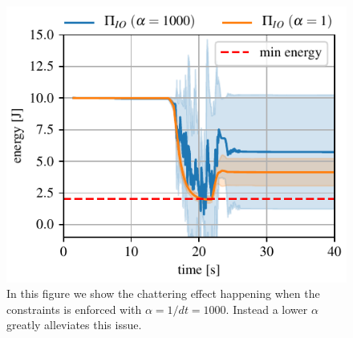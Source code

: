 \begin{figure}[t]
\centering
\includegraphics[width=0.8\columnwidth]{figures/fix_experiment/passivity_coefficient_comparison.pdf}
\caption{In this figure we show the chattering effect happening when the constraints is enforced with $\alpha = 1/dt = 1000$. Instead a lower $\alpha$ greatly alleviates this issue.}\label{fig:tank_as_zbf}
\end{figure}

